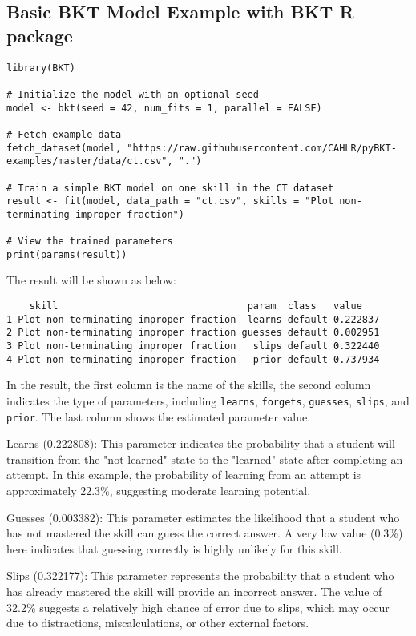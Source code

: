 \documentclass{article}
\begin{document}
\subsection{Basic BKT Model Example with BKT R package}

\begin{lstlisting}[caption={R code to train a simple BKT model}]
library(BKT)

# Initialize the model with an optional seed
model <- bkt(seed = 42, num_fits = 1, parallel = FALSE)

# Fetch example data
fetch_dataset(model, "https://raw.githubusercontent.com/CAHLR/pyBKT-examples/master/data/ct.csv", ".")

# Train a simple BKT model on one skill in the CT dataset
result <- fit(model, data_path = "ct.csv", skills = "Plot non-terminating improper fraction")

# View the trained parameters
print(params(result))
\end{lstlisting}

The result will be shown as below: 

\begin{verbatim}
    skill                                 param  class   value
1 Plot non-terminating improper fraction  learns default 0.222837
2 Plot non-terminating improper fraction guesses default 0.002951
3 Plot non-terminating improper fraction   slips default 0.322440
4 Plot non-terminating improper fraction   prior default 0.737934
\end{verbatim}

In the result, the first column is the name of the skills, the second column indicates the type of parameters, including \texttt{learns}, \texttt{forgets}, \texttt{guesses}, \texttt{slips}, and \texttt{prior}. The last column shows the estimated parameter value.

Learns (0.222808): This parameter indicates the probability that a student will transition from the "not learned" state to the "learned" state after completing an attempt. In this example, the probability of learning from an attempt is approximately 22.3\%, suggesting moderate learning potential.

Guesses (0.003382): This parameter estimates the likelihood that a student who has not mastered the skill can guess the correct answer. A very low value (0.3\%) here indicates that guessing correctly is highly unlikely for this skill.

Slips (0.322177): This parameter represents the probability that a student who has already mastered the skill will provide an incorrect answer. The value of 32.2\% suggests a relatively high chance of error due to slips, which may occur due to distractions, miscalculations, or other external factors.
\end{document}
